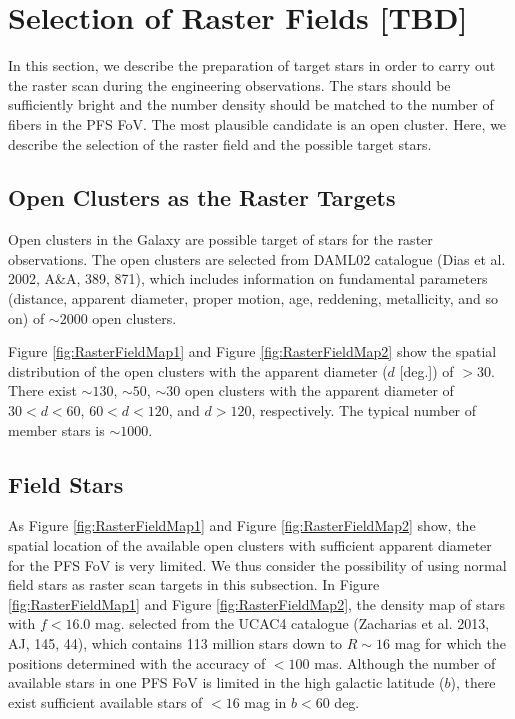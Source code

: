 \section{Selection of Raster Fields [TBD]\label{sec:RasterField}}

In this section, we describe the preparation of target stars in order to carry out the raster scan during the engineering observations. The stars should be sufficiently bright and the number density should be matched to the number of fibers in the PFS FoV. The most plausible candidate is an open cluster. Here, we describe the selection of the raster field and the possible target stars. 

\subsection{Open Clusters as the Raster Targets}
Open clusters in the Galaxy are possible target of stars for the raster observations. The open clusters are selected from DAML02 catalogue (Dias et al. 2002, A\&A, 389, 871), which includes information on fundamental parameters (distance, apparent diameter, proper motion, age, reddening, metallicity, and so on) of $\sim2000$ open clusters. 

Figure \ref{fig:RasterFieldMap1} and Figure \ref{fig:RasterFieldMap2} show the spatial distribution of the open clusters with the apparent diameter ($d$ [deg.]) of $>30$. There exist $\sim130$, $\sim50$, $\sim30$ open clusters with the apparent diameter of $30<d<60$, $60<d<120$, and $d>120$, respectively. The typical number of member stars is $\sim1000$. 

\subsection{Field Stars}
As Figure \ref{fig:RasterFieldMap1} and Figure \ref{fig:RasterFieldMap2} show, the spatial location of the available open clusters with sufficient apparent diameter for the PFS FoV is very limited. We thus consider the possibility of using normal field stars as raster scan targets in this subsection. In Figure \ref{fig:RasterFieldMap1} and Figure \ref{fig:RasterFieldMap2}, the density map of stars with $f<16.0$ mag. selected from the UCAC4 catalogue (Zacharias et al. 2013, AJ, 145, 44), which contains 113 million stars down to $R\sim16$ mag for which the positions determined with the accuracy of $<100$ mas. Although the number of available stars in one PFS FoV is limited in the high galactic latitude ($b$), there exist sufficient available stars of $<16$ mag in $b<60$ deg.

